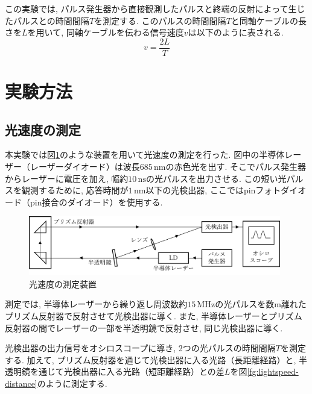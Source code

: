 \documentclass{jarticle}
\begin{document}
この実験では, パルス発生器から直接観測したパルスと終端の反射によって生じたパルスとの時間間隔$T$を測定する.
このパルスの時間間隔$T$と同軸ケーブルの長さを$L$を用いて, 同軸ケーブルを伝わる信号速度$v$は以下のように表される.
\begin{equation}
  v=\frac{2L}{T}
  \label{eq:v}
\end{equation}



\section{実験方法}


\subsection{光速度の測定}

本実験では図\ref{fg:lightspeed-method}のような装置を用いて光速度の測定を行った.
図中の半導体レーザー（レーザーダイオード）は波長$685\,\mathrm{nm}$の赤色光を出す.
そこでパルス発生器からレーザーに電圧を加え, 幅約$10\,\mathrm{ns}$の光パルスを出力させる.
この短い光パルスを観測するために, 応答時間が$1\,\mathrm{nm}$以下の光検出器, ここではpinフォトダイオード（pin接合のダイオード）を使用する.

\begin{figure}[H]
  \begin{center}
    \includegraphics[width=110mm]{experimental_method_picture.png}
    \caption{光速度の測定装置}
    \label{fg:lightspeed-method}
  \end{center}
\end{figure}

測定では, 半導体レーザーから繰り返し周波数約$15\,\mathrm{MHz}$の光パルスを数$\mathrm{m}$離れたプリズム反射器で反射させて光検出器に導く.
また, 半導体レーザーとプリズム反射器の間でレーザーの一部を半透明鏡で反射させ, 同じ光検出器に導く.

光検出器の出力信号をオシロスコープに導き, 2つの光パルスの時間間隔$T$を測定する.
加えて, プリズム反射器を通じて光検出器に入る光路（長距離経路）と, 半透明鏡を通じて光検出器に入る光路（短距離経路）との差$L$を図\ref{fg:lightspeed-distance}のように測定する.
\end{document}
